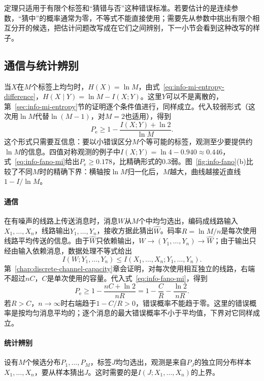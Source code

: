 定理只适用于有限个标签和“猜错与否”这种错误标准。若要估计的是连续参数，“猜中”的概率通常为零，不等式不能直接使用；需要先从参数中挑出有限个相互分开的候选，把估计问题改写成在它们之间辨别，下一小节会看到这种改写的样子。

\subsection{通信与统计辨别}
\label{sec:info-fano-applications}

当$X$在$M$个标签上均匀时，$H(X)=\ln M$，由式~\eqref{eq:info-mi-entropy-difference}，$H(X\mid Y)=\ln M-I(X;Y)$。这里$Y$可以不是离散的，第~\ref{sec:info-mi-entropy}节的证明逐个条件值进行，同样成立。代入较弱形式（这次用$\ln M$代替$\ln(M-1)$，对$M=2$也适用），得到
\begin{equation}
  P_{\mathrm{e}}\geq1-\frac{I(X;Y)+\ln2}{\ln M}.
  \label{eq:info-fano-mi}
\end{equation}
这个形式只需要互信息：要以小错误区分$M$个等可能的标签，观测至少要提供约$\ln M$的信息。四值对称观测的例子中$I(X;Y)=\ln4-0.940\approx0.446$，式~\eqref{eq:info-fano-mi}给出$P_{\mathrm{e}}\geq0.178$，比精确形式的$0.3$弱。图~\ref{fig:info-fano}(b)比较了不同$M$时的精确下界：横轴按$\ln M$归一化后，$M$越大，曲线越接近直线$1-I/\ln M$。

\paragraph{通信}
在有噪声的线路上传送消息时，消息$W$从$M$个中均匀选出，编码成线路输入$X_1,\dots,X_n$，线路输出$Y_1,\dots,Y_n$，接收方据此猜出$\hat{W}$。码率$R=\ln M/n$是每次使用线路平均传送的信息。由于$\hat{W}$只依赖输出，$W\to(Y_1,\dots,Y_n)\to\hat{W}$；由于输出只经由输入依赖消息，数据处理不等式给出
\[
  I(W;Y_1,\dots,Y_n)\leq I(X_1,\dots,X_n;Y_1,\dots,Y_n).
\]
第~\ref{chap:discrete-channel-capacity}章会证明，对每次使用相互独立的线路，右端不超过$nC$，$C$是单次使用的容量。代入式~\eqref{eq:info-fano-mi}，得到
\[
  P_{\mathrm{e}}\geq1-\frac{nC+\ln2}{nR}=1-\frac{C}{R}-\frac{\ln2}{nR}.
\]
若$R>C$，$n\to\infty$时右端趋于$1-C/R>0$，错误概率不能趋于零。这里的错误概率是按均匀消息平均的；逐个消息的最大错误概率不小于平均值，下界对它同样成立。

\paragraph{统计辨别}
设有$M$个候选分布$P_1,\dots,P_M$，标签$J$均匀选出，观测是来自$P_J$的独立同分布样本$X_1,\dots,X_n$，要从样本猜出$J$。这时需要的是$I(J;X_1,\dots,X_n)$的上界。

